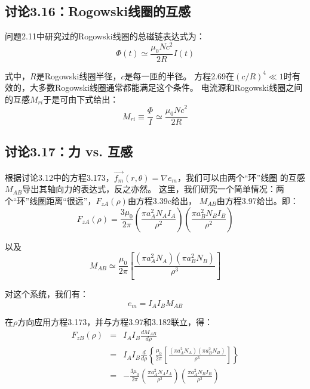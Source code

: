 \subsection{讨论3.16：Rogowski线圈的互感}
问题2.11中研究过的Rogowski线圈的总磁链表达式为：
 \begin{equation}%
\Phi(t)\simeq\frac{\mu_0Nc^2}{2R}I(t)
\end{equation}

式中，$R$是Rogowski线圈半径，$c$是每一匝的半径。
方程2.69在$(c/R)^4\ll 1$时有效的，大多数Rogowski线圈通常都能满足这个条件。
电流源和Rogowski线圈之间的互感$M_{ri}$于是可由下式给出：
\begin{equation}%
M_{ri}\equiv\frac{\Phi}{I}\simeq\frac{\mu_0Nc^2}{2R}
\end{equation}

\newpage



\subsection{讨论3.17：力 vs. 互感}
根据讨论3.12中的方程3.173，$\vec{f_m}(r,\theta)=\nabla e_m$，我们可以由两个“环”线圈
的互感$M_{AB}$导出其轴向力的表达式，反之亦然。
这里，我们研究一个简单情况：两个“环”线圈距离“很远”，$F_{zA}(\rho)$由方程3.39c给出，
$M_{AB}$由方程3.97给出。即：
 \begin{equation}%
F_{zA}(\rho)=\frac{3\mu_0}{2\pi}\left(\frac{\pi a_{A}^{2}N_AI_A}{\rho^2}\right)\left(\frac{\pi a_{B}^{2}N_BI_B}{\rho^2}\right)
\end{equation}

以及
\begin{equation}%
M_{AB}\simeq\frac{\mu_0}{2\pi}\left[\frac{(\pi a_{A}^{2}N_A)(\pi a_{B}^{2}N_B)}{\rho^3}\right]
\end{equation}

对这个系统，我们有：
\begin{equation}%
e_m=I_AI_BM_{AB}
\end{equation}

在$\rho$方向应用方程3.173，并与方程3.97和3.182联立，得：
\begin{eqnarray}%
F_{zB}(\rho)&=&I_A I_B\frac{dM_{AB}}{d\rho}\\
&=&I_A I_B\frac{d}{d\rho}\left\{\frac{\mu_0}{2\pi}\left[\frac{(\pi a_{A}^{2}N_A)(\pi a_{B}^{2}N_B)}{\rho^3}\right]\right\}\\
&=&-\frac{3\mu_0}{2\pi}\left(\frac{\pi a_{A}^{2}N_A I_A}{\rho^2}\right)\left(\frac{\pi a_{A}^{2}N_B I_B}{\rho^2}\right)
\end{eqnarray}

